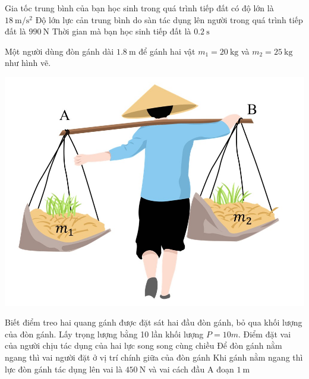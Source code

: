 \begin{ex}
	{\True Gia tốc trung bình của bạn học sinh trong quá trình tiếp đất có độ lớn là $\SI{18}{\meter/\second^2}$}
	{Độ lớn lực cản trung bình do sàn tác dụng lên người trong quá trình tiếp đất là $\SI{990}{\newton}$}
	{\True Thời gian mà bạn học sinh tiếp đất là $\SI{0.2}{\second}$}
\end{ex}
\begin{ex}
	Một người dùng đòn gánh dài $\SI{1.8}{\meter}$ để gánh hai vật $m_1=\SI{20}{\kilogram}$ và $m_2=\SI{25}{\kilogram}$ như hình vẽ. 
	\begin{center}
		\includegraphics[width=0.3\linewidth]{figs/D10-HKI-KTTX2-001-3}
	\end{center}
	Biết điểm treo hai quang gánh được đặt sát hai đầu đòn gánh, bỏ qua khối lượng của đòn gánh.  Lấy trọng lượng bằng 10 lần khối lượng $P=10m$.
	{\True Điểm đặt vai của người chịu tác dụng của hai lực song song cùng chiều}
	{Để đòn gánh nằm ngang thì vai người đặt ở vị trí chính giữa của đòn gánh}
	{\True Khi gánh nằm ngang thì lực đòn gánh tác dụng lên vai là $\SI{450}{\newton}$ và vai cách đầu A đoạn $\SI{1}{\meter}$}
\end{ex}
